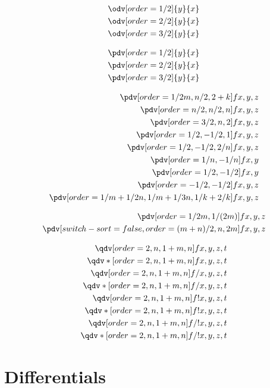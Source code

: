 \begin{align}
	\odv[order=1/2]{y}{x} \\
	\odv[order=2/2]{y}{x} \\
	\odv[order=3/2]{y}{x}
\end{align}

\begin{align}
	\pdv[order=1/2]{y}{x} \\
	\pdv[order=2/2]{y}{x} \\
	\pdv[order=3/2]{y}{x}
\end{align}

\begin{align}
	\pdv[order={1/2m,n/2,2+k}]{f}{x,y,z} \\
	\pdv[order={n/2,n/2,n}]{f}{x,y,z} \\
	\pdv[order={3/2,n,2}]{f}{x,y,z} \\
	\pdv[order={1/2,-1/2,1}]{f}{x,y,z} \\
	\pdv[order={1/2,-1/2,2/n}]{f}{x,y,z} \\
	\pdv[order={1/n,-1/n}]{f}{x,y} \\
	\pdv[order={1/2,-1/2}]{f}{x,y} \\
	\pdv[order={-1/2,-1/2}]{f}{x,y,z} \\
	\pdv[order={1/m+1/2n,1/m+1/3n,1/k+2/k}]{f}{x,y,z} \\
\end{align}

\begin{align}
	\pdv[order={1/2m,1/(2m)}]{f}{x,y,z} \\
	\pdv[switch-sort=false,order={(m+n)/2,n,2m}]{f}{x,y,z} \\
\end{align}

\begin{align}
	\qdv[order={2,n,1+m,n}]{f}{x,y,z,t} \\
	\qdv*[order={2,n,1+m,n}]{f}{x,y,z,t} \\
	\qdv[order={2,n,1+m,n}]{f}/{x,y,z,t} \\
	\qdv*[order={2,n,1+m,n}]{f}/{x,y,z,t} \\
	\qdv[order={2,n,1+m,n}]{f}!{x,y,z,t} \\
	\qdv*[order={2,n,1+m,n}]{f}!{x,y,z,t} \\
	\qdv[order={2,n,1+m,n}]{f}/!{x,y,z,t} \\
	\qdv*[order={2,n,1+m,n}]{f}/!{x,y,z,t}
\end{align}
	
	\clearpage
	\section{Differentials}

